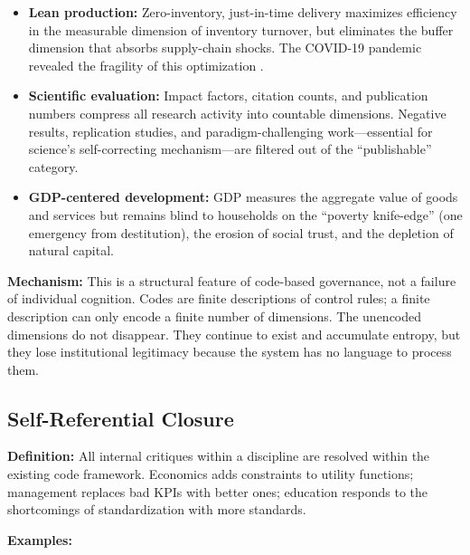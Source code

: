 \documentclass[11pt,a4paper]{article}
\begin{document}
\begin{itemize}
    \item \textbf{Lean production:} Zero-inventory, just-in-time delivery maximizes efficiency in the measurable dimension of inventory turnover, but eliminates the buffer dimension that absorbs supply-chain shocks. The COVID-19 pandemic revealed the fragility of this optimization \citep{choi2023}.

    \item \textbf{Scientific evaluation:} Impact factors, citation counts, and publication numbers compress all research activity into countable dimensions. Negative results, replication studies, and paradigm-challenging work---essential for science's self-correcting mechanism---are filtered out of the ``publishable'' category.

    \item \textbf{GDP-centered development:} GDP measures the aggregate value of goods and services but remains blind to households on the ``poverty knife-edge'' (one emergency from destitution), the erosion of social trust, and the depletion of natural capital.
\end{itemize}

\textbf{Mechanism:} This is a structural feature of code-based governance, not a failure of individual cognition. Codes are finite descriptions of control rules; a finite description can only encode a finite number of dimensions. The unencoded dimensions do not disappear. They continue to exist and accumulate entropy, but they lose institutional legitimacy because the system has no language to process them.

\subsection{Self-Referential Closure}

\textbf{Definition:} All internal critiques within a discipline are resolved within the existing code framework. Economics adds constraints to utility functions; management replaces bad KPIs with better ones; education responds to the shortcomings of standardization with more standards.

\textbf{Examples:}
\end{document}
